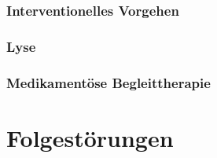 \subsubsection{Interventionelles Vorgehen}

\subsubsection{Lyse}

\subsubsection{Medikamentöse Begleittherapie}



\section{Folgestörungen}




\ChapterEnd